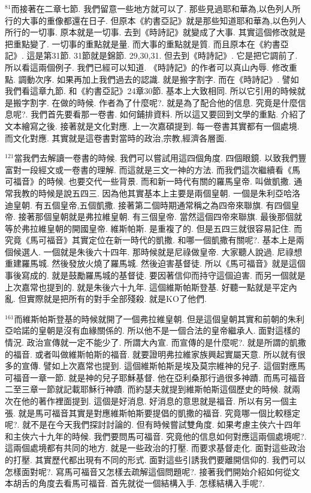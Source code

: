 \documentclass{book}
\begin{document}
$^{81}$而接著在二章七節.
我們留意一些地方就可以了.
那些見過耶和華為,以色列人所行的大事的重像都還在日子.
但原本《約書亞記》就是那些知道耶和華為,以色列人所行的一切事.
原本就是一切事.
去到《時詩記》就變成了大事.
其實這個修改就是把重點變了.
一切事的重點就是量.
而大事的重點就是質.
而且原本在《約書亞記》.
這是第31節.
31節就是錦節.
29,30,31.
但去到《時詩記》.
它是把它調前了.
所以看這兩個例子.
我們已經可以知道.
《時詩記》的作者可以真山內辱.
修改重點.
調動次序.
如果再加上我們過去的認識.
就是搬字割字.
而在《時詩記》.
譬如我們看這章九節.
和《約書亞記》24章30節.
基本上大致相同.
所以它引用的時候就是搬字割字.
在做的時候.
作者為了什麼呢?.
就是為了配合他的信息.
究竟是什麼信息呢?.
我們首先要看那一卷書.
如何鋪排資料.
所以這又要回到文學的重點.
介紹了文本繪寫之後.
接著就是文化對應.
上一次嘉碩提到.
每一卷書其實都有一個處境.
而文化對應.
其實就是這卷書對當時的政治,宗教,經濟各層面.

$^{121}$當我們去解讀一卷書的時候.
我們可以嘗試用這四個角度.
四個眼鏡.
以致我們豐富對一段經文或一卷書的理解.
而這就是三文一神的方法.
而我們這次繼續看《馬可福音》的時候.
也要交代一些背景.
而和新一時代有關的羅馬皇帝.
叫做凱撒.
通常我教的時候是說五四三.
因為他其實基本上主要是兩個皇朝.
一個是朱利亞哈洛迪皇朝.
有五個皇帝,五個凱撒.
接著第二個時期通常稱之為四帝來聯旗.
有四個皇帝.
接著那個皇朝就是弗拉維皇朝.
有三個皇帝.
當然這個四帝來聯旗.
最後那個就等於弗拉維皇朝的開國皇帝.
維斯帕斯.
是重複了的.
但是五四三就很容易記住.
而究竟《馬可福音》其實定位在新一時代的凱撒.
和哪一個凱撒有關呢?.
基本上是兩個候選人.
一個就是朱後六十四年.
那時候就是尼祿做皇帝.
大家聽人說過.
尼祿想重建羅馬城.
然後發放火燒了羅馬城.
然後迫害基督徒.
所以《馬可福音》就是這個事後寫成的.
就是鼓勵羅馬城的基督徒.
要因著信仰而持守這個迫害.
而另一個就是上次嘉常也提到的.
就是朱後六十九年.
這個維斯帕斯登基.
好聽一點就是平定內亂.
但實際就是把所有的對手全部殘殺.
就是KO了他們.

$^{161}$而維斯帕斯登基的時候就開了一個弗拉維皇朝.
但是這個皇朝其實和前朝的朱利亞哈諾的皇朝是沒有血緣關係的.
所以他不是一個合法的皇帝繼承人.
面對這樣的情況.
政治宣傳就一定不能少了.
所謂大內宣.
而宣傳的是什麼呢?.
就是所謂的凱撒的福音.
或者叫做維斯帕斯的福音.
就要證明弗拉維家族興起實屬天意.
所以就有很多的宣傳.
譬如上次嘉常也提到.
這個維斯帕斯是埃及莫宗維神的兒子.
這個對應馬可福音一章一節.
就是神的兒子耶穌基督.
他在亞利桑那行過很多神蹟.
而馬可福音二至三章一節就記載耶穌行神蹟.
而約瑟夫就提到維斯帕斯這個歷史的時候.
就兩次在他的著作裡面提到.
這個是好消息.
好消息的意思就是福音.
所以有另一個主張.
就是馬可福音其實是對應維斯帕斯要提倡的凱撒的福音.
究竟哪一個比較穩定呢?.
就不是在今天我們探討討論的.
但有時候嘗試雙角度.
如果考慮主俠六十四年和主俠六十九年的時候.
我們要問馬可福音.
究竟他的信息如何對應這兩個處境呢?.
這兩個處境都有共同的地方.
就是一些政治的打壓.
而要求基督走化.
面對這些政治的打壓.
其實歷代都出現有不同的形式.
面對這些引誘我們要離開信仰的.
我們可以怎樣面對呢?.
寫馬可福音又怎樣去疏解這個問題呢?.
接著我們開始介紹如何從文本胡舌的角度去看馬可福音.
首先就從一個結構入手.
怎樣結構入手呢?.
\end{document}
